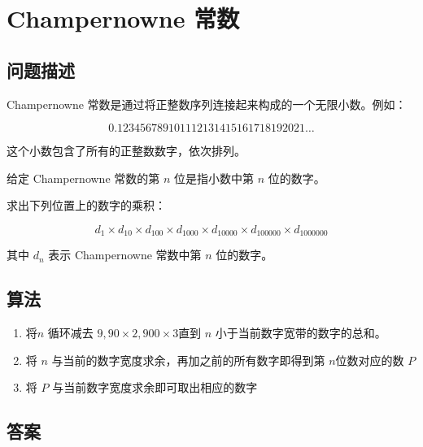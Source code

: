 \section{Champernowne 常数}
\subsection{问题描述}
\begin{tcolorbox}

	Champernowne 常数是通过将正整数序列连接起来构成的一个无限小数。例如：

	\[
		0.123456789101112131415161718192021\ldots
	\]

	这个小数包含了所有的正整数数字，依次排列。

	给定 Champernowne 常数的第 \( n \) 位是指小数中第 \( n \) 位的数字。

	求出下列位置上的数字的乘积：

	\[
		d_1 \times d_{10} \times d_{100} \times d_{1000} \times d_{10000} \times d_{100000} \times d_{1000000}
	\]

	其中 \( d_n \) 表示 Champernowne 常数中第 \( n \) 位的数字。
\end{tcolorbox}

\subsection{算法}
\begin{enumerate}
	\item 将$ n $ 循环减去 \( 9, 90 \times 2, 900 \times 3 \)直到 \( n \) 小于当前数字宽带的数字的总和。
	\item 将 \( n \) 与当前的数字宽度求余，再加之前的所有数字即得到第 \( n \)位数对应的数 \( P \)
	\item 将 \( P \) 与当前数字宽度求余即可取出相应的数字
\end{enumerate}

\subsection{答案}
